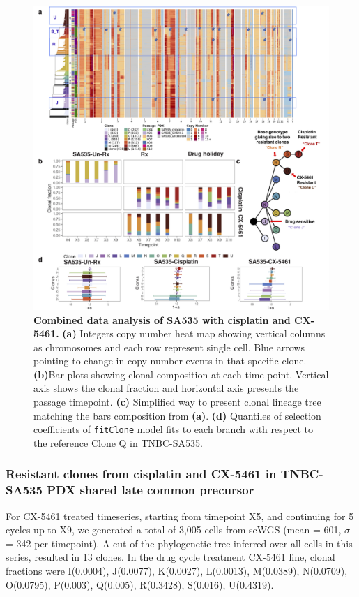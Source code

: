 \begin{figure}
\centering
\includegraphics[width=\textwidth]{Figures/chap4/SA535combinebarplots.png}
	
\caption[Combined data analysis of SA535 with cisplatin and CX-5461]
	{\small
	\textbf{Combined data analysis of SA535 with cisplatin and CX-5461.}
		\textbf{(a)} Integers copy number heat map showing vertical columns as chromosomes and each row represent single cell. Blue arrows pointing to change in copy number events in that specific clone. \textbf{(b)}Bar plots showing clonal composition at each time point. Vertical axis shows the clonal fraction and horizontal axis presents the passage timepoint. \textbf{(c)} Simplified way to present clonal lineage tree matching the bars composition from \textbf{(a)}. \textbf{(d)} Quantiles of selection coefficients of \texttt{fitClone} model fits to each branch with respect to the reference Clone Q in TNBC-SA535. 
	}
	\label{fig:SA535combinebarplots}
\end{figure}


\subsubsection{Resistant clones from cisplatin and CX-5461 in TNBC-SA535 PDX shared late common precursor}
For CX-5461 treated timeseries, starting from timepoint X5, and continuing for 5 cycles up to X9, we generated a total of 3,005 cells from scWGS (mean = 601, $\sigma$ = 342 per timepoint). A cut of the phylogenetic tree inferred over all cells in this series, resulted in 13 clones. In the drug cycle treatment CX-5461 line, clonal fractions were I(0.0004), J(0.0077), K(0.0027), L(0.0013), M(0.0389), N(0.0709), O(0.0795), P(0.003), Q(0.005), R(0.3428), S(0.016), U(0.4319). 


